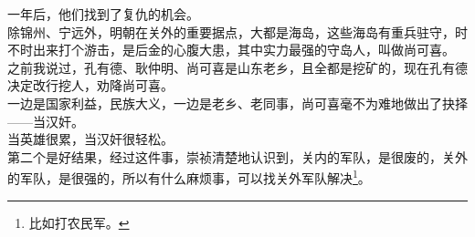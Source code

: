 \begin{multicols}{\theparacolNo}
一年后，他们找到了复仇的机会。\\

除锦州、宁远外，明朝在关外的重要据点，大都是海岛，这些海岛有重兵驻守，时不时出来打个游击，是后金的心腹大患，其中实力最强的守岛人，叫做尚可喜。\\

之前我说过，孔有德、耿仲明、尚可喜是山东老乡，且全都是挖矿的，现在孔有德决定改行挖人，劝降尚可喜。\\

一边是国家利益，民族大义，一边是老乡、老同事，尚可喜毫不为难地做出了抉择——当汉奸。\\

当英雄很累，当汉奸很轻松。\\

第二个是好结果，经过这件事，崇祯清楚地认识到，关内的军队，是很废的，关外的军队，是很强的，所以有什么麻烦事，可以找关外军队解决\footnote{比如打农民军。}。\\
\ifnum{}
	\end{multicols}
\fi
\newpage
